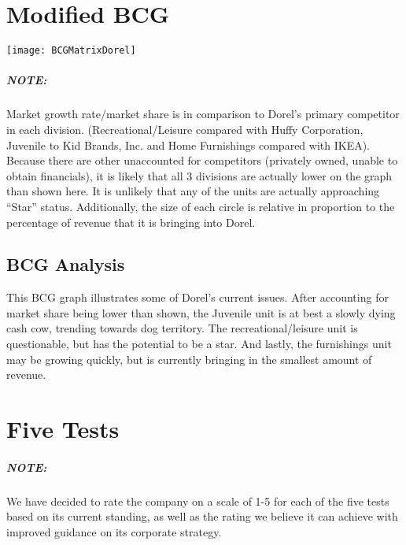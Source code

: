 \chapter{Modified BCG}
\label{chp:bcg}
\texttt{[image: BCGMatrixDorel]}
\paragraph{NOTE:}Market growth rate/market share is in comparison to Dorel’s primary competitor in each division.  (Recreational/Leisure compared with Huffy Corporation, Juvenile to Kid Brands, Inc. and Home Furnishings compared with IKEA).  Because there are other unaccounted for competitors (privately owned, unable to obtain financials), it is likely that all 3 divisions are actually lower on the graph than shown here.  It is unlikely that any of the units are actually approaching “Star” status.  Additionally, the size of each circle is relative in proportion to the percentage of revenue that it is bringing into Dorel.
\section{BCG Analysis}
This BCG graph illustrates some of Dorel's current issues.  After accounting for market share being lower than shown, the Juvenile unit is at best a slowly dying cash cow, trending towards dog territory.  The recreational/leisure unit is questionable, but has the potential to be a star.  And lastly, the furnishings unit may be growing quickly, but is currently bringing in the smallest amount of revenue.

\chapter{Five Tests}
\label{chp:tests}
\paragraph{NOTE:}We have decided to rate the company on a scale of 1-5 for each of the five tests based on its current standing, as well as the rating we believe it can achieve with improved guidance on its corporate strategy.



